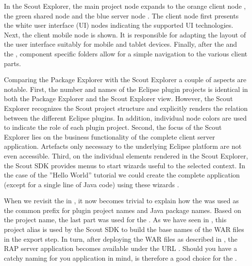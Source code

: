 \documentclass[a4paper,10pt,twoside]{book}
\begin{document}
In the Scout Explorer, the main project node expands to the orange client node , the green shared node  and the blue server node .
The client node first presents the white user interface (UI) nodes  indicating the supported UI technologies.
Next, the client mobile node  is shown.
It is responsible for adapting the layout of the user interface suitably for mobile and tablet devices.
Finally, after the  and the , component specific folders allow for a simple navigation to the various client parts.

Comparing the Package Explorer with the Scout Explorer a couple of aspects are notable.
First, the number and names of the Eclipse plugin projects is identical in both the Package Explorer and the Scout Explorer view.
However, the Scout Explorer recognizes the Scout project structure and explicitly renders the relation between the different Eclipse plugins.
In addition, individual node colors are used to indicate the role of each plugin project.
Second, the focus of the Scout Explorer lies on the business functionality of the complete client server application.
Artefacts only necessary to the underlying Eclipse platform are not even accessible.
Third, on the individual elements rendered in the Scout Explorer, the Scout SDK provides menus to start wizards useful to the selected context.
In the case of the ''Hello World'' tutorial we could create the complete application (except for a single line of Java code) using these wizards .

When we revisit the  in , it now becomes trivial to explain how the   was used as the common prefix for plugin project names and Java package names.
Based on the project name, the last part  was used for the .
As we have seen in , this project alias is used by the Scout SDK to build the base names of the WAR files in the export step.
In turn, after deploying the WAR files as described in , the RAP server application becomes available under the URL .
Should you have a catchy naming for you application in mind,  is therefore a good choice for the .
\end{document}
